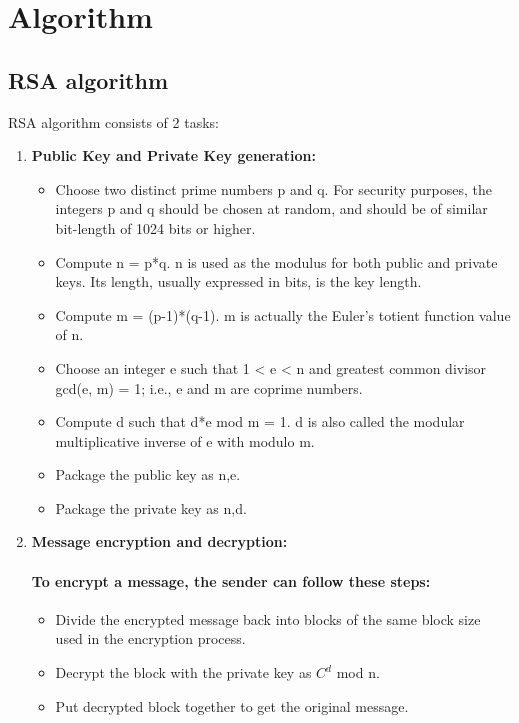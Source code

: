 \documentclass[a4paper,12pt]{article}
\newenvironment{codeblock}{\fontfamily{ccr}\selectfont}{\par}
\begin{document}
\section{Algorithm}
	\paragraph{}
	\subsection{RSA algorithm}
	RSA algorithm consists of 2 tasks:
	\begin{enumerate}
		\item  \textbf{Public Key and Private Key generation:} 
			\begin{codeblock}
			\begin{itemize}
				\item Choose two distinct prime numbers p and q. For security purposes, the integers p and q should be chosen at random, and should be of similar bit-length of 1024 bits or higher.
				\item Compute n = p*q. n is used as the modulus for both public and private keys. Its length, usually expressed in bits, is the key length. 
				\item Compute m = (p-1)*(q-1). m is actually the Euler's totient function value of n. 
				\item Choose an integer e such that 1 < e < n and greatest common divisor gcd(e, m) = 1; i.e., e and m are coprime numbers. 
				\item Compute d such that d*e mod m = 1. d is also called the modular multiplicative inverse of e with modulo m. 
				\item Package the public key as {n,e}. 
				\item Package the private key as {n,d}. 					
			\end{itemize}
			\end{codeblock}
				
		\item \textbf{Message encryption and decryption:}
			\paragraph{To encrypt a message, the sender can follow these steps:}
			\begin{codeblock}
			\begin{itemize}
				\item Divide the encrypted message back into blocks of the same block size used in the encryption process.
				\item Decrypt the block with the private key as $C^{d}$ mod n.
				\item Put decrypted block together to get the original message.
			\end{itemize}
			\end{codeblock}
	\end{enumerate}
\end{document}

